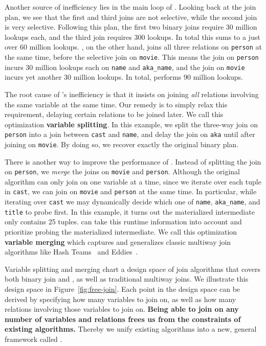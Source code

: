 Another source of inefficiency lies in the main loop of \GJ. 
Looking back at the join plan,
  we see that the first and third joins are not selective,
  while the second join is very selective.
Following this plan, the first two binary joins require
  30 million lookups each, 
  and the third join requires 300 lookups.
In total this sums to a just over 60 million lookups.
\GJ, on the other hand, joins all three relations on \texttt{person}
  at the same time, before the selective join on \texttt{movie}.
This means the join on \texttt{person} incurs 30 million lookups
  each on \texttt{name} and \texttt{aka\_name},
  and the join on \texttt{movie} incurs yet another 30 million lookups.
In total, \GJ performs 90 million lookups.

The root cause of \GJ's inefficiency is that it insists on 
  joining \emph{all} relations involving the same variable at the same time.
Our remedy is to simply relax this requirement,
  delaying certain relations to be joined later.
We call this optimization \textbf{variable splitting}.
In this example, we split the three-way join on \texttt{person}
  into a join between \texttt{cast} and \texttt{name},
  and delay the join on \texttt{aka} 
  until after joining on \texttt{movie}.
By doing so, we recover exactly the original binary plan.

There is another way to improve the performance of \GJ.
Instead of splitting the join on \texttt{person}, 
  we \emph{merge} the joins on \texttt{movie} and \texttt{person}.
Although the original \GJ algorithm can only join on one variable at a time,
  since we iterate over each tuple in \texttt{cast},
  we can join on \texttt{movie} and \texttt{person} at the same time.
In particular, while iterating over \texttt{cast} we may 
  dynamically decide which one of \texttt{name}, \texttt{aka\_name}, 
  and \texttt{title} to probe first.
In this example, it turns out the materialized intermediate
  only contains 25 tuples. 
\GJ can take this runtime information into account
  and prioritize probing the materialized intermediate.
We call this optimization \textbf{variable merging}
  which captures and generalizes classic multiway join algorithms
  like Hash Teams~\cite{} and Eddies~\cite{}.

Variable splitting and merging chart a design space of join algorithms
  that covers both binary join and \GJ, 
  as well as traditional multiway joins.
We illustrate this design space in Figure~\ref{fig:free-join}.
Each point in the design space can be derived by specifying 
  how many variables to join on, 
  as well as how many relations involving those variables to join on.
\textbf{
Being able to join on any number of variables and relations
  frees us from the constraints of existing algorithms.
}
Thereby we unify existing algorithms into a new, 
  general framework called \FJ.

